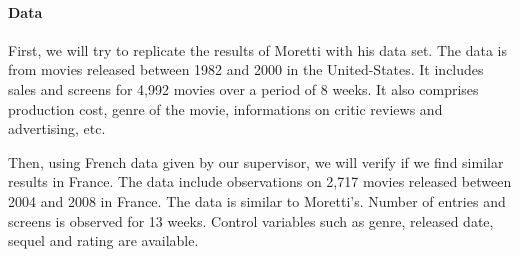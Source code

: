 \documentclass{article}
\begin{document}
\paragraph{Data} First, we will try to replicate the results of Moretti with his data set. The data is from movies released between 1982 and 2000 in the United-States. It includes sales and screens for 4,992 movies over a period of 8 weeks. It also comprises production cost, genre of the movie, informations on critic reviews and advertising, etc. 

Then, using French data given by our supervisor, we will verify if we find similar results in France. The data include observations on 2,717 movies released between 2004 and 2008 in France. The data is similar to Moretti's. Number of entries and screens is observed for 13 weeks. Control variables such as genre, released date, sequel and rating are available.
\end{document}
